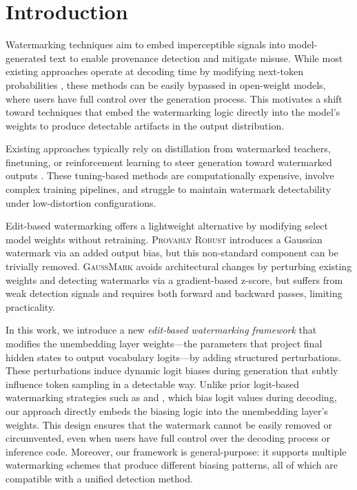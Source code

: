 \section{Introduction}

Watermarking techniques aim to embed imperceptible signals into model-generated text to enable provenance detection and mitigate misuse. While most existing approaches operate at decoding time by modifying next-token probabilities \citep{kirchenbauer2023watermark, aaronson2023reform, kuditipudi2023robust, liu2024adaptive}, these methods can be easily bypassed in open-weight models, where users have full control over the generation process. This motivates a shift toward techniques that embed the watermarking logic directly into the model's weights to produce detectable artifacts in the output distribution.

Existing approaches typically rely on distillation from watermarked teachers, finetuning, or reinforcement learning to steer generation toward watermarked outputs \citep{gu2023learnability, xu2024learningwatermarkllmgeneratedtext, elhassan2025can}. These tuning-based methods are computationally expensive, involve complex training pipelines, and struggle to maintain watermark detectability under low-distortion configurations.

Edit-based watermarking offers a lightweight alternative by modifying select model weights without retraining. \textsc{Provably Robust} \cite{christ2024provably} introduces a Gaussian watermark via an added output bias, but this non-standard component can be trivially removed. \textsc{GaussMark} \cite{block2025gaussmark} avoids architectural changes by perturbing existing weights and detecting watermarks via a gradient-based z-score, but suffers from weak detection signals and requires both forward and backward passes, limiting practicality.

In this work, we introduce a new \emph{edit-based watermarking framework} that modifies the unembedding layer weights—the parameters that project final hidden states to output vocabulary logits—by adding structured perturbations. These perturbations induce dynamic logit biases during generation that subtly influence token sampling in a detectable way. Unlike prior logit-based watermarking strategies such as \citet{kirchenbauer2023watermark} and \citet{liu2024adaptive}, which bias logit values during decoding, our approach directly embeds the biasing logic into the unembedding layer's weights. This design ensures that the watermark cannot be easily removed or circumvented, even when users have full control over the decoding process or inference code. Moreover, our framework is general-purpose: it supports multiple watermarking schemes that produce different biasing patterns, all of which are compatible with a unified detection method.

